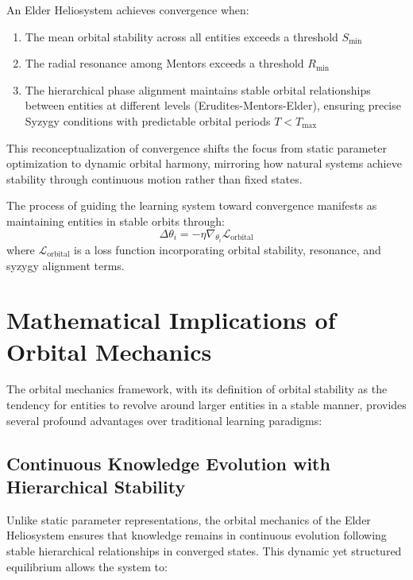 \begin{theorem}
An Elder Heliosystem achieves convergence when:
\begin{enumerate}
    \item The mean orbital stability across all entities exceeds a threshold $S_{\text{min}}$
    \item The radial resonance among Mentors exceeds a threshold $R_{\text{min}}$
    \item The hierarchical phase alignment maintains stable orbital relationships between entities at different levels (Erudites-Mentors-Elder), ensuring precise Syzygy conditions with predictable orbital periods $T < T_{\text{max}}$
\end{enumerate}
\end{theorem}

This reconceptualization of convergence shifts the focus from static parameter optimization to dynamic orbital harmony, mirroring how natural systems achieve stability through continuous motion rather than fixed states.

\begin{proposition}
The process of guiding the learning system toward convergence manifests as maintaining entities in stable orbits through:
\begin{equation}
\Delta\theta_i = -\eta \nabla_{\theta_i} \mathcal{L}_{\text{orbital}}
\end{equation}
where $\mathcal{L}_{\text{orbital}}$ is a loss function incorporating orbital stability, resonance, and syzygy alignment terms.
\end{proposition}

\section{Mathematical Implications of Orbital Mechanics}

The orbital mechanics framework, with its definition of orbital stability as the tendency for entities to revolve around larger entities in a stable manner, provides several profound advantages over traditional learning paradigms:

\subsection{Continuous Knowledge Evolution with Hierarchical Stability}

Unlike static parameter representations, the orbital mechanics of the Elder Heliosystem ensures that knowledge remains in continuous evolution following stable hierarchical relationships in converged states. This dynamic yet structured equilibrium allows the system to:


